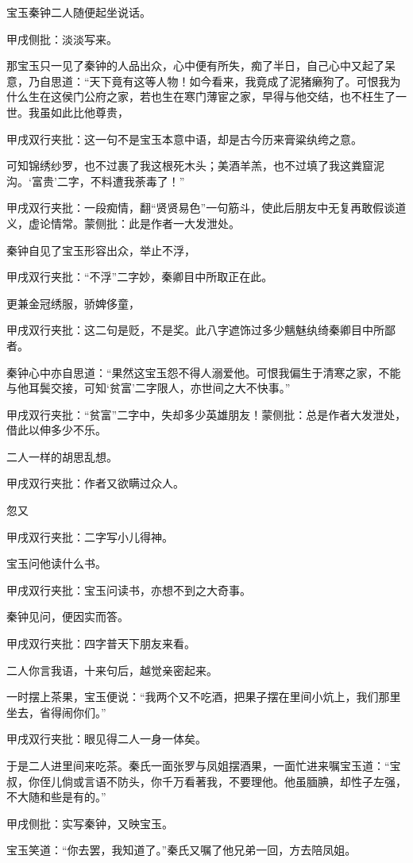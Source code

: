 \begin{parag}
    宝玉秦钟二人随便起坐说话。\begin{note}甲戌侧批：淡淡写来。\end{note}那宝玉只一见了秦钟的人品出众，心中便有所失，痴了半日，自己心中又起了呆意，乃自思道：“天下竟有这等人物！如今看来，我竟成了泥猪癞狗了。可恨我为什么生在这侯门公府之家，若也生在寒门薄宦之家，早得与他交结，也不枉生了一世。我虽如此比他尊贵，\begin{note}甲戌双行夹批：这一句不是宝玉本意中语，却是古今历来膏粱纨绔之意。\end{note}可知锦绣纱罗，也不过裹了我这根死木头；美酒羊羔，也不过填了我这粪窟泥沟。‘富贵’二字，不料遭我荼毒了！”\begin{note}甲戌双行夹批：一段痴情，翻“贤贤易色”一句筋斗，使此后朋友中无复再敢假谈道义，虚论情常。蒙侧批：此是作者一大发泄处。\end{note}秦钟自见了宝玉形容出众，举止不浮，\begin{note}甲戌双行夹批：“不浮”二字妙，秦卿目中所取正在此。\end{note}更兼金冠绣服，骄婢侈童，\begin{note}甲戌双行夹批：这二句是贬，不是奖。此八字遮饰过多少魑魅纨绮秦卿目中所鄙者。\end{note}秦钟心中亦自思道：“果然这宝玉怨不得人溺爱他。可恨我偏生于清寒之家，不能与他耳鬓交接，可知‘贫富’二字限人，亦世间之大不快事。”\begin{note}甲戌双行夹批：“贫富”二字中，失却多少英雄朋友！蒙侧批：总是作者大发泄处，借此以伸多少不乐。\end{note}二人一样的胡思乱想。\begin{note}甲戌双行夹批：作者又欲瞒过众人。\end{note}忽又\begin{note}甲戌双行夹批：二字写小儿得神。\end{note}宝玉问他读什么书。\begin{note}甲戌双行夹批：宝玉问读书，亦想不到之大奇事。\end{note}秦钟见问，便因实而答。\begin{note}甲戌双行夹批：四字普天下朋友来看。\end{note}二人你言我语，十来句后，越觉亲密起来。
\end{parag}


\begin{parag}
    一时摆上茶果，宝玉便说：“我两个又不吃酒，把果子摆在里间小炕上，我们那里坐去，省得闹你们。”\begin{note}甲戌双行夹批：眼见得二人一身一体矣。\end{note}于是二人进里间来吃茶。秦氏一面张罗与凤姐摆酒果，一面忙进来嘱宝玉道：“宝叔，你侄儿倘或言语不防头，你千万看著我，不要理他。他虽腼腆，却性子左强，不大随和些是有的。”\begin{note}甲戌侧批：实写秦钟，又映宝玉。\end{note}宝玉笑道：“你去罢，我知道了。”秦氏又嘱了他兄弟一回，方去陪凤姐。
\end{parag}


